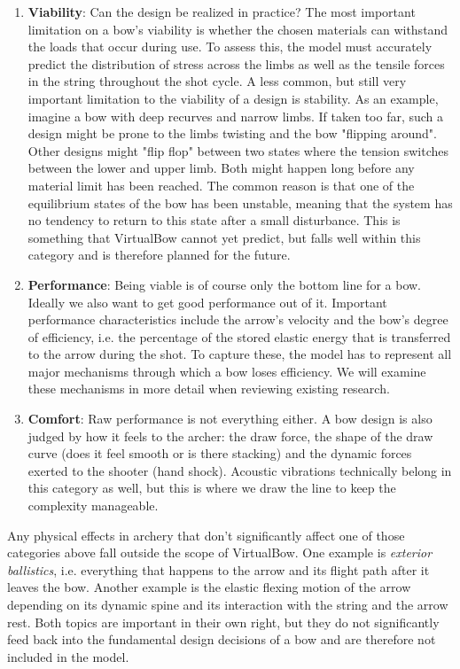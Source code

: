 \begin{enumerate}
\item \textbf{Viability}: Can the design be realized in practice?
The most important limitation on a bow's viability is whether the chosen materials can withstand the loads that occur during use.
To assess this, the model must accurately predict the distribution of stress across the limbs as well as the tensile forces in the string throughout the shot cycle.
A less common, but still very important limitation to the viability of a design is stability.
As an example, imagine a bow with deep recurves and narrow limbs.
If taken too far, such a design might be prone to the limbs twisting and the bow "flipping around".
Other designs might "flip flop" between two states where the tension switches between the lower and upper limb.
Both might happen long before any material limit has been reached.
The common reason is that one of the equilibrium states of the bow has been unstable, meaning that the system has no tendency to return to this state after a small disturbance.
This is something that VirtualBow cannot yet predict, but falls well within this category and is therefore planned for the future.

\item \textbf{Performance}: Being viable is of course only the bottom line for a bow.
Ideally we also want to get good performance out of it.
Important performance characteristics include the arrow's velocity and the bow's degree of efficiency, i.e. the percentage of the stored elastic energy that is transferred to the arrow during the shot.
To capture these, the model has to represent all major mechanisms through which a bow loses efficiency.
We will examine these mechanisms in more detail when reviewing existing research.

\item \textbf{Comfort}: Raw performance is not everything either.
A bow design is also judged by how it feels to the archer: the draw force, the shape of the draw curve (does it feel smooth or is there stacking) and the dynamic forces exerted to the shooter (hand shock).
Acoustic vibrations technically belong in this category as well, but this is where we draw the line to keep the complexity manageable.
\end{enumerate}

Any physical effects in archery that don't significantly affect one of those categories above fall outside the scope of VirtualBow.
One example is \textit{exterior ballistics}, i.e. everything that happens to the arrow and its flight path after it leaves the bow.
Another example is the elastic flexing motion of the arrow depending on its dynamic spine and its interaction with the string and the arrow rest.
Both topics are important in their own right, but they do not significantly feed back into the fundamental design decisions of a bow and are therefore not included in the model.

